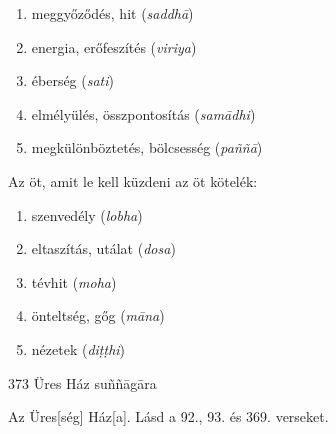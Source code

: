 \begin{notesdescription}
\begin{enumerate}
\item meggyőződés, hit (\textit{saddhā})
\item energia, erőfeszítés (\textit{viriya})
\item éberség (\textit{sati})
\item elmélyülés, összpontosítás (\textit{samādhi})
\item megkülönböztetés, bölcsesség (\textit{paññā})
\end{enumerate}

Az öt, amit le kell küzdeni az öt kötelék:

\begin{enumerate}
\item szenvedély (\textit{lobha})
\item eltaszítás, utálat (\textit{dosa})
\item tévhit (\textit{moha})
\item önteltség, gőg (\textit{māna})
\item nézetek (\textit{diṭṭhi})
\end{enumerate}

\item[{373}
{Üres Ház}
{suññāgāra}] \hfill\par

Az Üres[ség] Ház[a]. Lásd a 92., 93. és 369. verseket.

\end{notesdescription}

